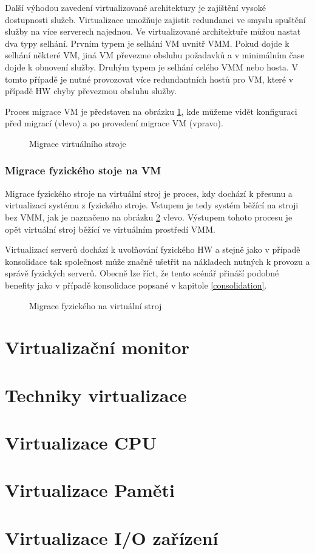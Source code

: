 Další výhodou zavedení virtualizované architektury je zajištění vysoké dostupnosti služeb. Virtualizace umožňuje zajistit redundanci ve smyslu spuštění služby na více serverech najednou. Ve virtualizované architektuře můžou
nastat dva typy selhání. Prvním typem je selhání VM uvnitř VMM. Pokud dojde k selhání některé VM, jiná VM převezme obsluhu požadavků a v minimálním čase dojde k obnovení služby. Druhým typem je selhání celého VMM nebo hosta.
V tomto případě je nutné provozovat více redundantních hostů pro VM, které v případě HW chyby převezmou obsluhu služby.

Proces migrace VM je představen na obrázku \ref{migration1}, kde můžeme vidět konfiguraci před migrací (vlevo) a po provedení migrace VM (vpravo).

\begin{figure}
    \centering    
    \caption{Migrace virtuálního stroje}
    \label{migration1}
\end{figure}

\subsubsection*{Migrace fyzického stoje na VM}

Migrace fyzického stroje na virtuální stroj je proces, kdy dochází k přesunu a virtualizaci systému z fyzického stroje. Vstupem je tedy systém běžící na stroji bez VMM, jak je naznačeno na obrázku \ref{migration2} vlevo. 
Výstupem tohoto procesu je opět virtuální stroj běžící ve virtuálním prostředí VMM.

Virtualizací serverů dochází k uvolňování fyzického HW a stejně jako v případě konsolidace tak společnost může značně ušetřit na nákladech nutných k provozu a správě fyzických serverů. Obecně lze říct, že tento scénář přináší 
podobné benefity jako v případě konsolidace popsané v kapitole \ref{consolidation}.

\begin{figure}
    \centering    
    \caption{Migrace fyzického na virtuální stroj}
    \label{migration2}
\end{figure}

\section{Virtualizační monitor}
\label{vmm}



\section{Techniky virtualizace}



\section{Virtualizace CPU}
\section{Virtualizace Paměti}
\section{Virtualizace I/O zařízení}


